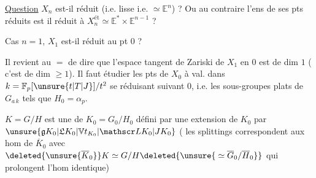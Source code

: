 \uline{Question} $X_n$ est-il réduit (i.e. lisse i.e. $\simeq\mathbb E^n$) ? Ou au contraire l'ens de ses pts réduits est il réduit à $X_n^{\mathrm{ét}}\simeq\mathbb E^*\times\mathbb E^{n-1}$ ?

Cas $n=1$, $X_1$ est-il réduit  au pt $0$ ?

Il revient au $=$ de dire que l'espace tangent de Zariski de $X_1$ en $0$ est de dim $1$ ( c'est de dim $\geq1$).  Il faut étudier les pts de $X_0$ à val. dans $k=\mathbb F_p[\unsure{t|T|J}]/t^2$ se réduisant suivant $0$, i.e.  les sous-groupes plats  de $G_{a\,k}$ tels que $H_0=\alpha_p$.

$K=G/H$ est une  de $K_0=G_0/H_0$ défini par une extension de $K_0$ par $\unsure{\mathfrak g K_0|\mathfrak L K_0|\mathbb V t_{K_0}|\mathscr L K_0|J K_0}$ ( les splittings correspondent aux hom de $\overline K_0$  avec $\deleted{\unsure{\overline K_0}}K\simeq G/H\deleted{\unsure{{}\simeq\overline G_0/\overline H_0}}$ \deleted{\unsure{)}} qui prolongent l'hom identique)

